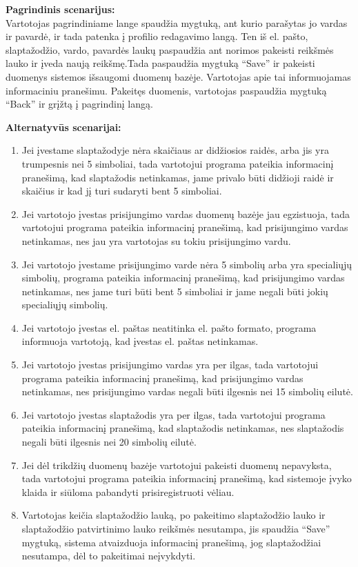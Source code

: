 \documentclass{VUMIFPSkursinis}
\begin{document}
	\textbf{Pagrindinis scenarijus:}\\
	Vartotojas pagrindiniame lange spaudžia mygtuką, ant kurio parašytas jo vardas ir pavardė, ir tada patenka į profilio redagavimo langą. Ten iš el. pašto, slaptažodžio, vardo, pavardės laukų paspaudžia ant norimos pakeisti reikšmės lauko ir įveda naują reikšmę.Tada paspaudžia mygtuką “Save” ir pakeisti duomenys sistemos išsaugomi duomenų bazėje. Vartotojas apie tai informuojamas informaciniu pranešimu. Pakeitęs duomenis, vartotojas paspaudžia mygtuką “Back” ir grįžtą į pagrindinį langą.

	\textbf{Alternatyvūs scenarijai:}
	\begin{enumerate}[itemsep=-2mm]
		\item Jei įvestame slaptažodyje nėra skaičiaus ar didžiosios raidės, arba jis yra trumpesnis nei 5 simboliai, tada vartotojui programa pateikia informacinį pranešimą, kad slaptažodis netinkamas, jame privalo būti didžioji raidė ir skaičius ir kad jį turi sudaryti bent 5 simboliai.
		\item Jei vartotojo įvestas prisijungimo vardas duomenų bazėje jau egzistuoja, tada vartotojui programa pateikia informacinį pranešimą, kad prisijungimo vardas netinkamas, nes jau yra vartotojas su tokiu prisijungimo vardu.
		\item Jei vartotojo įvestame prisijungimo varde nėra 5 simbolių arba yra specialiųjų simbolių, programa pateikia informacinį pranešimą, kad prisijungimo vardas netinkamas, nes jame turi būti bent 5 simboliai ir jame negali būti jokių specialiųjų simbolių.
		\item Jei vartotojo įvestas el. paštas neatitinka el. pašto formato, programa informuoja vartotoją, kad įvestas el. paštas netinkamas.
		\item Jei vartotojo įvestas prisijungimo vardas yra per ilgas, tada vartotojui programa pateikia informacinį pranešimą, kad prisijungimo vardas netinkamas, nes prisijungimo vardas negali būti ilgesnis nei 15 simbolių eilutė.
		\item Jei  vartotojo įvestas slaptažodis yra per ilgas, tada vartotojui programa pateikia informacinį pranešimą, kad slaptažodis netinkamas, nes slaptažodis negali būti ilgesnis nei 20 simbolių eilutė.
		\item Jei dėl trikdžių duomenų bazėje vartotojui pakeisti duomenų nepavyksta, tada vartotojui programa pateikia informacinį pranešimą, kad sistemoje įvyko klaida ir siūloma pabandyti prisiregistruoti vėliau.
		\item Vartotojas keičia slaptažodžio lauką, po pakeitimo slaptažodžio lauko ir slaptažodžio patvirtinimo lauko reikšmės nesutampa, jis spaudžia “Save” mygtuką, sistema atvaizduoja informacinį pranešimą, jog slaptažodžiai nesutampa, dėl to pakeitimai neįvykdyti.
	\end{enumerate} 
\end{document}

